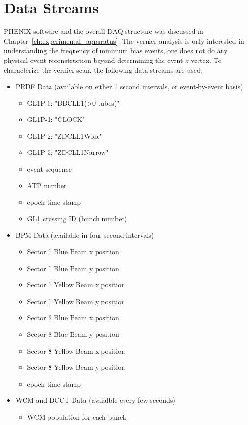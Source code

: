 \section{Data Streams}
\label{ch:DataStreams}

PHENIX software and the overall DAQ structure was discussed in
Chapter~\ref{ch:experimental_apparatus}. The vernier analysis is only interested
in understanding the frequency of minimum bias events, one does not do any
physical event reconstruction beyond determining the event $z$-vertex. To
characterize the vernier scan, the following data streams are used:

\begin{itemize}
\item PRDF Data (available on either 1 second intervals, or event-by-event basis)
  \begin{itemize}
  \item GL1P-0: "BBCLL1(\textgreater0 tubes)"
  \item GL1P-1: "CLOCK"
  \item GL1P-2: "ZDCLL1Wide"
  \item GL1P-3: "ZDCLL1Narrow"
  \item event-sequence
  \item ATP number
  \item epoch time stamp
  \item GL1 crossing ID (bunch number)
  \end{itemize}
\item BPM Data (available in four second intervals)
  \begin{itemize}
  \item Sector 7 Blue Beam x position
  \item Sector 7 Blue Beam y position
  \item Sector 7 Yellow Beam x position
  \item Sector 7 Yellow Beam y position
  \item Sector 8 Blue Beam x position
  \item Sector 8 Blue Beam y position
  \item Sector 8 Yellow Beam x position
  \item Sector 8 Yellow Beam y position
  \item epoch time stamp
  \end{itemize}
\item WCM and DCCT Data (avaialble every few seconds)
  \begin{itemize}
  \item WCM population for each bunch

\end{itemize}
\end{itemize}
